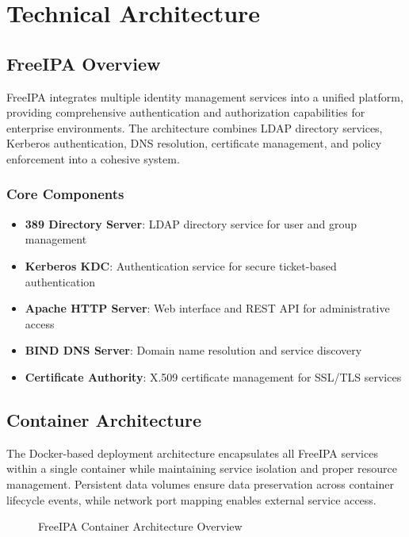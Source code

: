 \documentclass[12pt,a4paper]{report}
\begin{document}
\chapter{Technical Architecture}

\section{FreeIPA Overview}

FreeIPA integrates multiple identity management services into a unified platform, providing comprehensive authentication and authorization capabilities for enterprise environments. The architecture combines LDAP directory services, Kerberos authentication, DNS resolution, certificate management, and policy enforcement into a cohesive system.

\subsection{Core Components}

\begin{itemize}
    \item \textbf{389 Directory Server}: LDAP directory service for user and group management
    \item \textbf{Kerberos KDC}: Authentication service for secure ticket-based authentication
    \item \textbf{Apache HTTP Server}: Web interface and REST API for administrative access
    \item \textbf{BIND DNS Server}: Domain name resolution and service discovery
    \item \textbf{Certificate Authority}: X.509 certificate management for SSL/TLS services
\end{itemize}

\section{Container Architecture}

The Docker-based deployment architecture encapsulates all FreeIPA services within a single container while maintaining service isolation and proper resource management. Persistent data volumes ensure data preservation across container lifecycle events, while network port mapping enables external service access.

\begin{figure}[H]
    \centering
    \caption{FreeIPA Container Architecture Overview}
    \label{fig:architecture}
\end{figure}
\end{document}
